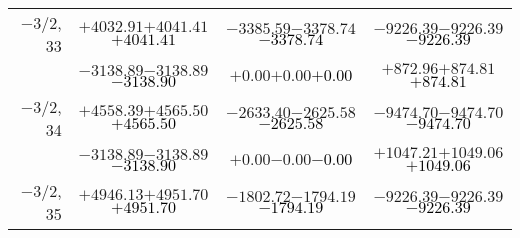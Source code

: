 \documentclass[compress]{beamer}
\begin{document}
\begin{frame}
{\begin{tabular}{r | c | c | c}
$-$3/2, 33 & $+4032.91$\hspace{0.1 cm}$+4041.41$\hspace{0.1 cm}\textcolor{black}{$+4041.41$} & $-3385.59$\hspace{0.1 cm}$-3378.74$\hspace{0.1 cm}\textcolor{black}{$-3378.74$} & $-9226.39$\hspace{0.1 cm}$-9226.39$\hspace{0.1 cm}\textcolor{black}{$-9226.39$} \\
           & $-3138.89$\hspace{0.1 cm}$-3138.89$\hspace{0.1 cm}\textcolor{black}{$-3138.90$} & $+0.00$\hspace{0.1 cm}$+0.00$\hspace{0.1 cm}\textcolor{black}{$+0.00$} & $+872.96$\hspace{0.1 cm}$+874.81$\hspace{0.1 cm}\textcolor{black}{$+874.81$} \\
$-$3/2, 34 & $+4558.39$\hspace{0.1 cm}$+4565.50$\hspace{0.1 cm}\textcolor{black}{$+4565.50$} & $-2633.40$\hspace{0.1 cm}$-2625.58$\hspace{0.1 cm}\textcolor{black}{$-2625.58$} & $-9474.70$\hspace{0.1 cm}$-9474.70$\hspace{0.1 cm}\textcolor{black}{$-9474.70$} \\
           & $-3138.89$\hspace{0.1 cm}$-3138.89$\hspace{0.1 cm}\textcolor{black}{$-3138.90$} & $+0.00$\hspace{0.1 cm}$-0.00$\hspace{0.1 cm}\textcolor{black}{$-0.00$} & $+1047.21$\hspace{0.1 cm}$+1049.06$\hspace{0.1 cm}\textcolor{black}{$+1049.06$} \\
$-$3/2, 35 & $+4946.13$\hspace{0.1 cm}$+4951.70$\hspace{0.1 cm}\textcolor{black}{$+4951.70$} & $-1802.72$\hspace{0.1 cm}$-1794.19$\hspace{0.1 cm}\textcolor{black}{$-1794.19$} & $-9226.39$\hspace{0.1 cm}$-9226.39$\hspace{0.1 cm}\textcolor{black}{$-9226.39$} \\

\end{tabular}}
\end{frame}
\end{document}
